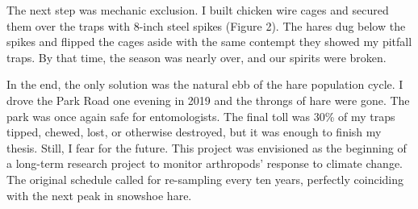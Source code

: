 The next step was mechanic exclusion. I built chicken wire cages and secured them over the traps with 8-inch steel spikes (Figure 2). The hares dug below the spikes and flipped the cages aside with the same contempt they showed my pitfall traps. By that time, the season was nearly over, and our spirits were broken.

In the end, the only solution was the natural ebb of the hare population cycle. I drove the Park Road one evening in 2019 and the throngs of hare were gone. The park was once again safe for entomologists. The final toll was 30\% of my traps tipped, chewed, lost, or otherwise destroyed, but it was enough to finish my thesis. Still, I fear for the future. This project was envisioned as the beginning of a long-term research project to monitor arthropods’ response to climate change. The original schedule called for re-sampling every ten years, perfectly coinciding with the next peak in snowshoe hare.



